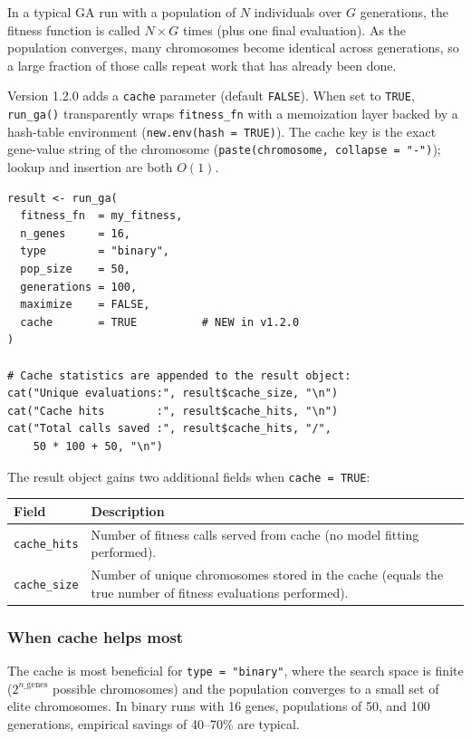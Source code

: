 \documentclass[11pt,a4paper]{article}
\begin{document}
In a typical GA run with a population of $N$ individuals over $G$ generations,
the fitness function is called $N \times G$ times (plus one final evaluation).
As the population converges, many chromosomes become identical across
generations, so a large fraction of those calls repeat work that has already
been done.

Version 1.2.0 adds a \texttt{cache} parameter (default \texttt{FALSE}).
When set to \texttt{TRUE}, \texttt{run\_ga()} transparently wraps
\texttt{fitness\_fn} with a memoization layer backed by a hash-table
environment (\texttt{new.env(hash = TRUE)}). The cache key is the exact
gene-value string of the chromosome (\texttt{paste(chromosome, collapse =
"-")}); lookup and insertion are both $O(1)$.

\begin{lstlisting}
result <- run_ga(
  fitness_fn  = my_fitness,
  n_genes     = 16,
  type        = "binary",
  pop_size    = 50,
  generations = 100,
  maximize    = FALSE,
  cache       = TRUE          # NEW in v1.2.0
)

# Cache statistics are appended to the result object:
cat("Unique evaluations:", result$cache_size, "\n")
cat("Cache hits        :", result$cache_hits, "\n")
cat("Total calls saved :", result$cache_hits, "/",
    50 * 100 + 50, "\n")
\end{lstlisting}

The result object gains two additional fields when \texttt{cache = TRUE}:

\begin{center}
\begin{tabular}{lp{9cm}}
  \toprule
  \textbf{Field} & \textbf{Description} \\
  \midrule
  \texttt{cache\_hits} & Number of fitness calls served from cache (no model
    fitting performed). \\
  \texttt{cache\_size} & Number of unique chromosomes stored in the cache
    (equals the true number of fitness evaluations performed). \\
  \bottomrule
\end{tabular}
\end{center}

\subsubsection*{When cache helps most}

The cache is most beneficial for \texttt{type = "binary"}, where the search
space is finite ($2^{n\_\mathrm{genes}}$ possible chromosomes) and the
population converges to a small set of elite chromosomes. In binary runs with
16 genes, populations of 50, and 100 generations, empirical savings of
40--70\% are typical.
\end{document}
